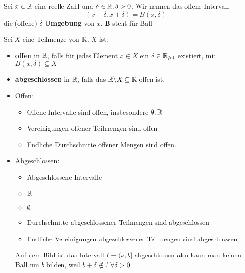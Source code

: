 \documentclass[main.tex]{subfiles}
\begin{document}
\begin{Definition}[Umgebung]
  Sei $x \in \mathbb{R}$ eine reelle Zahl und $\delta \in \mathbb{R}, \delta >0$. Wir nennen das offene Intervall
  $$(x-\delta,x+\delta) = B(x,\delta)$$
  die (offene) $\delta$-\textbf{Umgebung} von $x$.
  \textbf{B} steht für Ball.
\end{Definition}

\begin{Definition}
  Sei $X$ eine Teilmenge von $\mathbb{R}$. $X$ ist:
  \begin{itemize}
    \item \textbf{offen} in $\mathbb{R}$, falls für jedes Element $x\in X$ ein $\delta \in \mathbb{R}_{\geqslant 0}$ existiert, mit $B(x,\delta) \subseteq X$
    \item \textbf{abgeschlossen} in $\mathbb{R}$, falls das $\mathbb{R} \backslash X \subseteq \mathbb{R}$ offen ist.
  \end{itemize}
\end{Definition}

\begin{Beispiel}
  \begin{itemize}
  \item Offen:
  \begin{itemize}
    \item Offene Intervalle sind offen, insbesondere $\emptyset, \mathbb{R}$
    \item Vereinigungen offener Teilmengen sind offen
    \item Endliche Durchschnitte offener Mengen sind offen.
  \end{itemize}
  \item Abgeschlossen:
  \begin{itemize}
    \item Abgeschlossene Intervalle
    \item $\mathbb{R}$
    \item $\emptyset$
    \item Durchschnitte abgeschlossener Teilmengen sind abgeschlossen
    \item Endliche Vereinigungen abgeschlossener Teilmengen sind abgeschlossen
  \end{itemize}
  \begin{Bemerkung}
    Auf dem Bild ist das Intervall $I = (a,b]$ abgeschlossen also kann man keinen Ball um $b$ bilden, weil $b+\delta \notin I \;\forall \delta > 0$
  \end{Bemerkung}
  \end{itemize}
\end{Beispiel}
\end{document}
